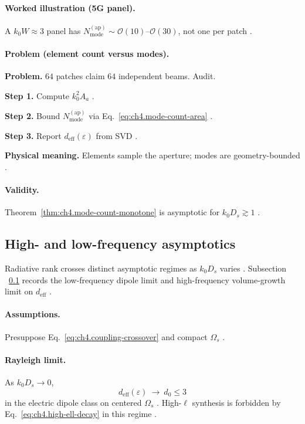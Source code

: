 \paragraph{Worked illustration (5G panel).}
A \(k_{0}W\approx3\) panel has \(N_{\mathrm{mode}}^{\mathrm{(ap)}}\sim\mathcal{O}(10)\)--\(\mathcal{O}(30)\), not one per patch
\cite{collin2001,harrington2001,hansen1988}.

\paragraph{Problem (element count versus modes).}
\textbf{Problem.} \(64\) patches claim \(64\) independent beams. Audit.

\textbf{Step 1.} Compute \(k_{0}^{2}A_{a}\) \cite{jackson1999,stratton1941}.

\textbf{Step 2.} Bound \(N_{\mathrm{mode}}^{\mathrm{(ap)}}\) via Eq.~\eqref{eq:ch4.mode-count-area} \cite{hansen1988,harrington2001}.

\textbf{Step 3.} Report \(d_{\mathrm{eff}}(\varepsilon)\) from SVD \cite{devaney2004}.

\textbf{Physical meaning.} Elements sample the aperture; modes are geometry-bounded \cite{collin2001}.

\paragraph{Validity.}
Theorem~\ref{thm:ch4.mode-count-monotone} is asymptotic for \(k_{0}D_{s}\gtrsim1\) \cite{jackson1999,hansen1988}.


\subsection{High- and low-frequency asymptotics}
\label{sec:ch482}

Radiative rank crosses distinct asymptotic regimes as \(k_{0}D_{s}\) varies \cite{stratton1941,jackson1999,hansen1988}. Subsection
~\ref{sec:ch482} records the low-frequency dipole limit and high-frequency volume-growth limit on \(d_{\mathrm{eff}}\)
\cite{harrington2001,devaney2004}.

\paragraph{Assumptions.}
Presuppose Eq.~\eqref{eq:ch4.coupling-crossover} and compact \(\Omega_{s}\) \cite{stratton1941,hansen1988}.

\paragraph{Rayleigh limit.}
As \(k_{0}D_{s}\to0\),
\begin{equation}
\label{eq:ch4.rayleigh-rank-limit}
d_{\mathrm{eff}}(\varepsilon)
\ \longrightarrow\
d_{0}\le3
\end{equation}
in the electric dipole class on centered \(\Omega_{s}\) \cite{jackson1999,stratton1941,harrington2001}. High-\(\ell\) synthesis is
forbidden by Eq.~\eqref{eq:ch4.high-ell-decay} in this regime \cite{hansen1988,devaney2004}.

